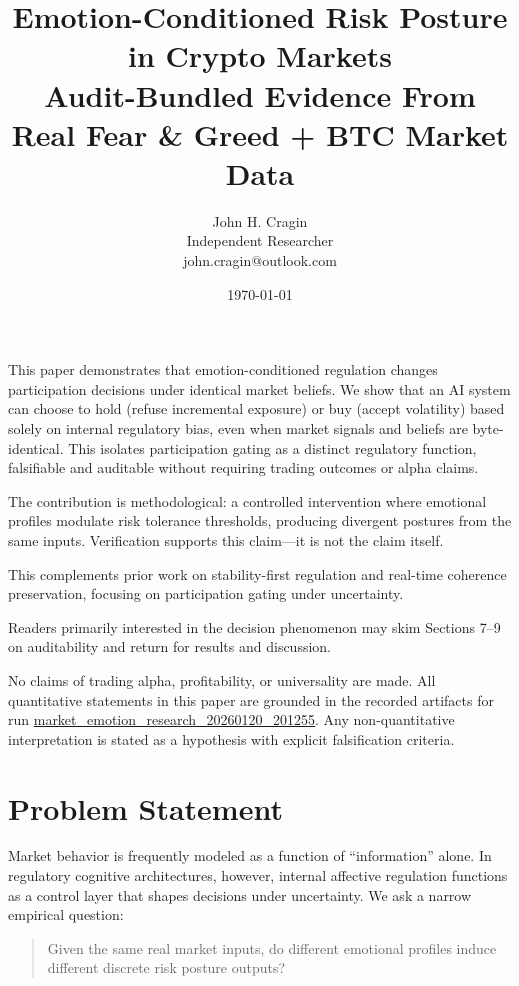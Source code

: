 \documentclass[12pt,a4paper]{report}
\title{Emotion-Conditioned Risk Posture in Crypto Markets\\
\large Audit-Bundled Evidence From Real Fear \& Greed + BTC Market Data}
\author{John H. Cragin\\
Independent Researcher\\
john.cragin@outlook.com}
\date{\today}
\begin{document}
\maketitle

This paper demonstrates that emotion-conditioned regulation changes participation decisions under identical market beliefs. We show that an AI system can choose to hold (refuse incremental exposure) or buy (accept volatility) based solely on internal regulatory bias, even when market signals and beliefs are byte-identical. This isolates participation gating as a distinct regulatory function, falsifiable and auditable without requiring trading outcomes or alpha claims.

The contribution is methodological: a controlled intervention where emotional profiles modulate risk tolerance thresholds, producing divergent postures from the same inputs. Verification supports this claim—it is not the claim itself.

This complements prior work on stability-first regulation and real-time coherence preservation, focusing on participation gating under uncertainty.

Readers primarily interested in the decision phenomenon may skim Sections 7–9 on auditability and return for results and discussion.

No claims of trading alpha, profitability, or universality are made. All quantitative statements in this paper are grounded in the recorded artifacts for run \href{https://github.com/jhcragin/SpiralBrain-v3.0-public/tree/main/market_emotion_risk_posture/results}{market_emotion_research_20260120_201255}. Any non-quantitative interpretation is stated as a hypothesis with explicit falsification criteria.

\section{Problem Statement}

Market behavior is frequently modeled as a function of ``information'' alone. In regulatory cognitive architectures, however, internal affective regulation functions as a control layer that shapes decisions under uncertainty. We ask a narrow empirical question:

\begin{quote}
Given the same real market inputs, do different emotional profiles induce different discrete risk posture outputs?
\end{quote}
\end{document}
